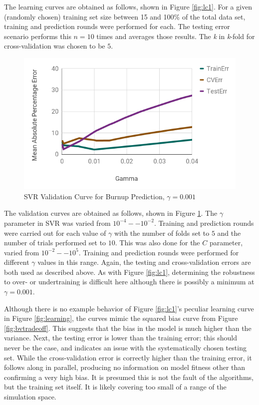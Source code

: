 The learning curves are obtained as follows, shown in Figure \ref{fig:lc1}.
For a given (randomly chosen) training set size between 15 and 100\% of the
total data set, training and prediction rounds were performed for each. The
testing error scenario performs this $n=10$ times and averages those results.
The \textit{k} in \textit{k}-fold for cross-validation was chosen to be $5$.

\begin{figure}[!htb]
    \centering
    \includegraphics[width=\linewidth]{./chapters/demo_method/vc1.png}
    \caption{\acrshort{SVR} Validation Curve for Burnup Prediction, $\gamma = 0.001$}
    \label{fig:vc1}
\end{figure}

The validation curves are obtained as follows, shown in Figure \ref{fig:vc1}.
The $\gamma$ parameter in \gls{SVR} was varied from $10^{-4} -- 10^{-2}$.
Training and prediction rounds were carried out for each value of $\gamma$ with
the number of folds set to $5$ and the number of trials performed set to $10$.
This was also done for the $C$ parameter, varied from $10^{-2} -- 10^{5}$.
Training and prediction rounds were performed for different $\gamma$ values in
this range.  Again, the testing and cross-validation errors are both used as
described above. As with Figure \ref{fig:lc1}, determining the robustness to
over- or undertraining is difficult here although there is possibly a minimum
at $\gamma=0.001$.  

Although there is no example behavior of Figure \ref{fig:lc1}'s peculiar
learning curve in Figure \ref{fig:learning}, the curves mimic the squared bias
curve from Figure \ref{fig:bvtradeoff}. This suggests that the bias in the
model is much higher than the variance.  Next, the testing error is lower than
the training error; this should never be the case, and indicates an issue with
the systematically chosen testing set.  While the cross-validation error is
correctly higher than the training error, it follows along in parallel,
producing no information on model fitness other than confirming a very high
bias.  It is presumed this is not the fault of the algorithms, but the training
set itself.  It is likely covering too small of a range of the simulation
space.

